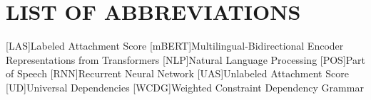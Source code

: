  \noindent


\chapter*{LIST OF ABBREVIATIONS}
\begin{acronym}
        [LAS]{Labeled Attachment Score}
        [mBERT]{Multilingual-Bidirectional Encoder Representations from Transformers}
        [NLP]{Natural Language Processing}
        [POS]{Part of Speech}
        [RNN]{Recurrent Neural Network}
        [UAS]{Unlabeled Attachment Score}
        [UD]{Universal Dependencies}
        [WCDG]{Weighted Constraint Dependency Grammar}
\end{acronym}
